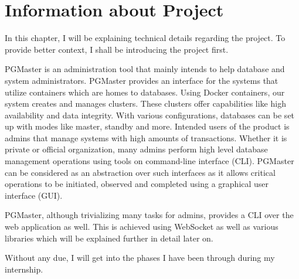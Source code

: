 \chapter{Information about Project}
In this chapter, I will be explaining technical details regarding the 
project. To provide better context, I shall be introducing the project first. 
\par
PGMaster is an administration tool that mainly intends to help database and 
system administrators. PGMaster provides an interface for the systems that 
utilize containers which are homes to databases. Using Docker containers, our 
system creates and manages clusters. These clusters offer capabilities like 
high availability and data integrity. With various configurations, databases 
can be set up with modes like master, standby and more. Intended users of the 
product is admins that manage systems with high amounts of transactions. 
Whether it is private or official organization, many admins perform high level 
database management operations using tools on command-line interface (CLI). 
PGMaster can be considered as an abstraction over such interfaces as it allows 
critical operations to be initiated, observed and completed using a graphical 
user interface (GUI).
\par
PGMaster, although trivializing many tasks for admins, provides a CLI over the 
web application as well. This is achieved using WebSocket as well as various 
libraries which will be explained further in detail later on.
\par
Without any due, I will get into the phases I have been through during my 
internship.
